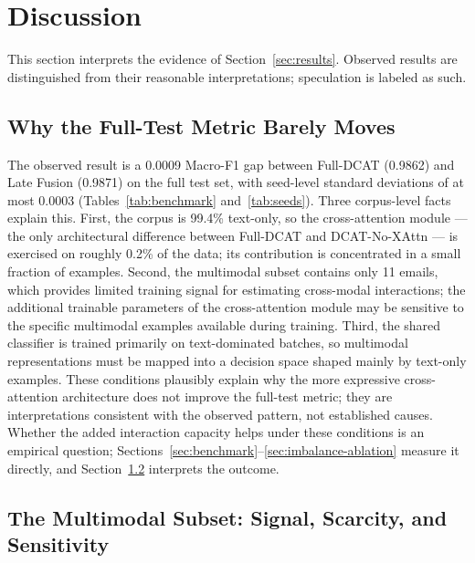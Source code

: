 \documentclass[10pt,twoside]{article}
\begin{document}
\section{Discussion}\label{sec:discussion}

This section interprets the evidence of Section~\ref{sec:results}. Observed results are distinguished from their reasonable interpretations; speculation is labeled as such.

\subsection{Why the Full-Test Metric Barely Moves}\label{sec:disc-fulltest}

The observed result is a 0.0009 Macro-F1 gap between Full-DCAT (0.9862) and Late Fusion (0.9871) on the full test set, with seed-level standard deviations of at most 0.0003 (Tables~\ref{tab:benchmark} and~\ref{tab:seeds}). Three corpus-level facts explain this. First, the corpus is 99.4\% text-only, so the cross-attention module --- the only architectural difference between Full-DCAT and DCAT-No-XAttn --- is exercised on roughly 0.2\% of the data; its contribution is concentrated in a small fraction of examples. Second, the multimodal subset contains only 11 emails, which provides limited training signal for estimating cross-modal interactions; the additional trainable parameters of the cross-attention module may be sensitive to the specific multimodal examples available during training. Third, the shared classifier is trained primarily on text-dominated batches, so multimodal representations must be mapped into a decision space shaped mainly by text-only examples. These conditions plausibly explain why the more expressive cross-attention architecture does not improve the full-test metric; they are interpretations consistent with the observed pattern, not established causes. Whether the added interaction capacity helps under these conditions is an empirical question; Sections~\ref{sec:benchmark}--\ref{sec:imbalance-ablation} measure it directly, and Section~\ref{sec:disc-mm} interprets the outcome.

\subsection{The Multimodal Subset: Signal, Scarcity, and Sensitivity}\label{sec:disc-mm}
\end{document}
